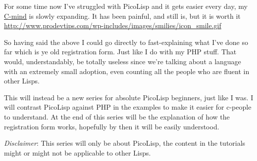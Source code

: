 For some time now I've struggled with PicoLisp and it gets easier every day,
my \href{http://www.prodevtips.com/2007/10/15/the-c-dominion/}{C-mind} is
slowly expanding. It has been painful, and still is, but it is worth it
\href{http://www.prodevtips.com/wp-includes/images/smilies/icon_smile.gif}{http://www.prodevtips.com/wp-includes/images/smilies/icon\_smile.gif}

So having said the above I could go directly to fast-explaining what
I've done so far which is ye old registration form. Just like I do with
my PHP stuff. That would, understandably, be totally useless since we're
talking about a language with an extremely small adoption, even counting
all the people who are fluent in other Lisps.

This will instead be a new series for absolute PicoLisp beginners,
just like I was. I will contrast PicoLisp against PHP in the examples
to make it easier for c-people to understand. At the end of this
series will be the explanation of how the registration form works,
hopefully by then it will be easily understood.

\emph{Disclaimer}: This series will only be about PicoLisp, the
content in the tutorials might or might not be applicable to other
Lisps.


